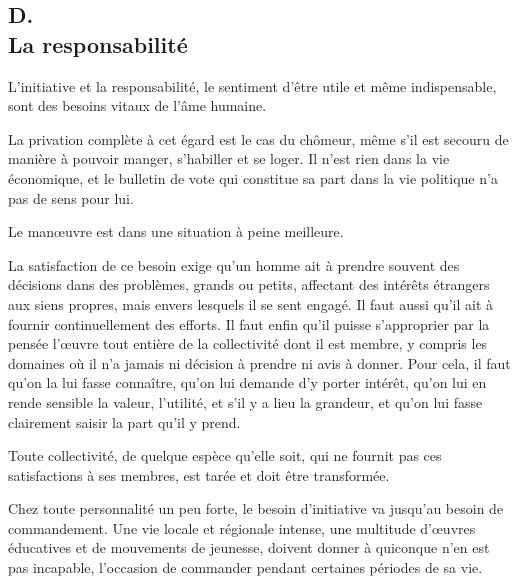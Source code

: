 \documentclass[french,twoside]{book} %
\begin{document}
\subsection[D. La responsabilité]{D. \\
La responsabilité}
\noindent \par
L'initiative et la responsabilité, le sentiment d'être utile et même indispensable, sont des besoins vitaux de l'âme humaine.\par
La privation complète à cet égard est le cas du chômeur, même s'il est secouru de manière à pouvoir manger, s'habiller et se loger. Il n'est rien dans la vie économique, et le bulletin de vote qui constitue sa part dans la vie politique n'a pas de sens pour lui.\par
Le manœuvre est dans une situation à peine meilleure.\par
La satisfaction de ce besoin exige qu'un homme ait à prendre souvent des décisions dans des problèmes, grands ou petits, affectant des intérêts étrangers aux siens propres, mais envers lesquels il se sent engagé. Il faut aussi qu'il ait à fournir continuellement des efforts. Il faut enfin qu'il puisse s'approprier par la pensée l'œuvre tout entière de la collectivité dont il est membre, y compris les domaines où il n'a jamais ni décision à prendre ni avis à donner. Pour cela, il faut qu'on la lui fasse connaître, qu'on lui demande d'y porter intérêt, qu'on lui en rende sensible la valeur, l'utilité, et s'il y a lieu la grandeur, et qu'on lui fasse clairement saisir la part qu'il y prend.\par
Toute collectivité, de quelque espèce qu'elle soit, qui ne fournit pas ces satisfactions à ses membres, est tarée et doit être transformée.\par
Chez toute personnalité un peu forte, le besoin d'initiative va jusqu'au besoin de commandement. Une vie locale et régionale intense, une multitude d'œuvres éducatives et de mouvements de jeunesse, doivent donner à quiconque n'en est pas incapable, l'occasion de commander pendant certaines périodes de sa vie.\par
\end{document}

